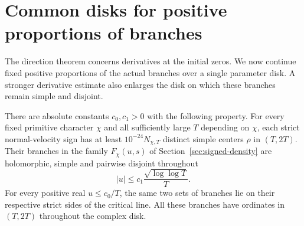\section{Common disks for positive proportions of branches}
\label{sec:common-deformation}
The direction theorem concerns derivatives at the initial zeros. We
now continue fixed positive proportions of the actual branches over a
single parameter disk. A stronger derivative estimate also enlarges
the disk on which these branches remain simple and disjoint.

\begin{theorem}\label{thm:common-deformation}
There are absolute constants $c_0,c_1>0$ with the following property.
For every fixed primitive character $\chi$ and all sufficiently large
$T$ depending on $\chi$, each strict normal-velocity sign has at least
$10^{-24}N_{\chi,T}$ distinct simple centers $\rho$ in $(T,2T)$.
Their branches in the family $F_\chi(u,s)$ of
Section~\ref{sec:signed-density} are holomorphic, simple and pairwise
disjoint throughout
\[
                   |u|\le c_1\frac{\sqrt{\log\log T}}T.
\]
For every positive real $u\le c_0/T$, the same two sets of branches
lie on their respective strict sides of the critical line. All these
branches have ordinates in $(T,2T)$ throughout the complex disk.
\end{theorem}

